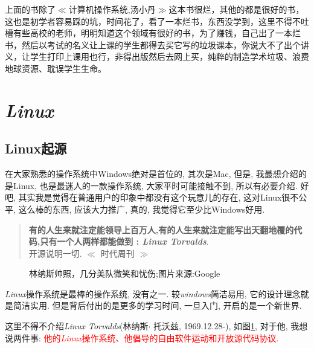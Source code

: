 \documentclass[utf8]{book}
\begin{document}
	上面的书除了$\ll$计算机操作系统,汤小丹$\gg$这本书很烂，其他的都是很好的书，这也是初学者容易踩的坑，时间花了，看了一本烂书，东西没学到，这里不得不吐槽有些高校的老师，明明知道这个领域有很好的书，为了赚钱，自己出了一本烂书，然后以考试的名义让上课的学生都得去买它写的垃圾课本，你说大不了出个讲义，让学生打印上课用也行，非得出版然后去网上买，纯粹的制造学术垃圾、浪费地球资源、耽误学生生命。
	
	\section{\textit{Linux}}
	\subsection{Linux起源}
	
	在大家熟悉的操作系统中Windows绝对是首位的, 其次是Mac, 但是, 我最想介绍的是Linux,  也是最迷人的一款操作系统, 大家平时可能接触不到, 所以有必要介绍. 好吧, 其实我是觉得在普通用户的印象中都没有这个玩意儿的存在, 这对Linux很不公平, 这么棒的东西, 应该大力推广, 真的, 我觉得它至少比Windows好用.


	\begin{quotation}
	\textcolor{dkgreen}{\textbf{有的人生来就注定能领导上百万人,有的人生来就注定能写出天翻地覆的代码,只有一个人两样都能做到 : \textit{Linux Torvalds}}}.
	\\
	 开源说明一切.  \qquad \qquad \qquad \qquad \qquad \qquad  $\ll$ 时代周刊 $\gg$
	\end{quotation}

	\begin{figure}[H]
	\centering
	\caption{\small{林纳斯帅照，几分美队微笑和忧伤;图片来源:Google}}
	\label{fig1}
	\end{figure}

	
	\textit{Linux}操作系统是最棒的操作系统, 没有之一. 较\textit{{\large windows}}简洁易用, 它的设计理念就是简洁实用. 但是背后付出的是更多的学习时间, 一旦入门, 开启的是一个新世界. 

	这里不得不介绍\textit{Linux Torvalds}(林纳斯$\cdot$ 托沃兹, 1969.12.28-), 如图\ref{fig1}, 对于他, 我想说两件事: \textcolor{red}{他的\textit{Linux}操作系统、他倡导的自由软件运动和开放源代码协议.}
	
\end{document}
